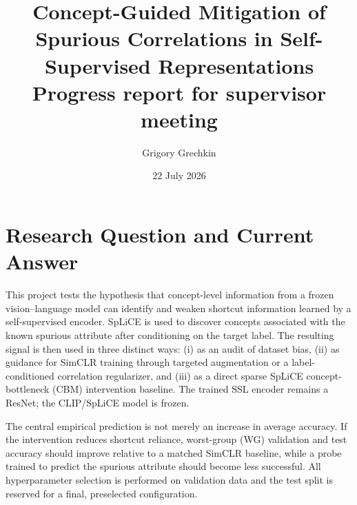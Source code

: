 \documentclass[11pt,a4paper]{article}
\title{\textbf{Concept-Guided Mitigation of Spurious Correlations in Self-Supervised Representations}\\[0.4em]
\large Progress report for supervisor meeting}
\author{Grigory Grechkin}
\date{22 July 2026}
\begin{document}
\maketitle

\begin{center}
\end{center}

\section{Research Question and Current Answer}

This project tests the hypothesis that concept-level information from a frozen
vision--language model can identify and weaken shortcut information learned by a
self-supervised encoder. SpLiCE is used to discover concepts associated with the
known spurious attribute after conditioning on the target label. The resulting
signal is then used in three distinct ways: (i) as an audit of dataset bias,
(ii) as guidance for SimCLR training through targeted augmentation or a
label-conditioned correlation regularizer, and (iii) as a direct sparse
SpLiCE concept-bottleneck (CBM) intervention baseline. The trained SSL encoder
remains a ResNet; the CLIP/SpLiCE model is frozen.

The central empirical prediction is not merely an increase in average accuracy.
If the intervention reduces shortcut reliance, worst-group (WG) validation and
test accuracy should improve relative to a matched SimCLR baseline, while a
probe trained to predict the spurious attribute should become less successful.
All hyperparameter selection is performed on validation data and the test split
is reserved for a final, preselected configuration.
\end{document}
